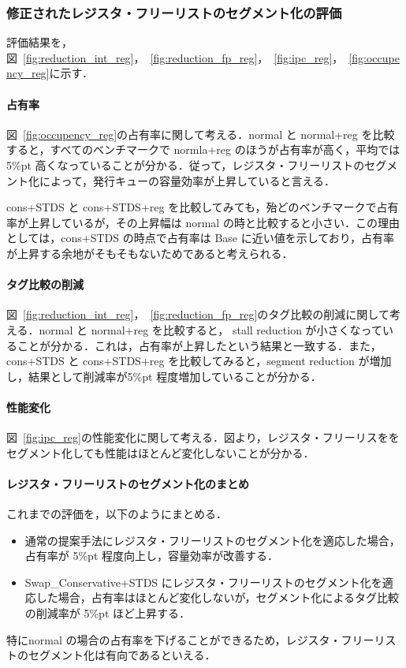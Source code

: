 \documentclass[twocolumn]{jsarticle}
\begin{document}
  \subsubsection{修正されたレジスタ・フリーリストのセグメント化の評価}
  評価結果を，図~\ref{fig:reduction_int_reg}，~\ref{fig:reduction_fp_reg}，~\ref{fig:ipc_reg}，~\ref{fig:occupency_reg}に示す．

  \paragraph{占有率}
  図~\ref{fig:occupency_reg}の占有率に関して考える．normal と normal+reg を比較すると，すべてのベンチマークで normla+reg のほうが占有率が高く，平均では 5\%pt 高くなっていることが分かる．従って，レジスタ・フリーリストのセグメント化によって，発行キューの容量効率が上昇していると言える．

  cons+STDS と cons+STDS+reg を比較してみても，殆どのベンチマークで占有率が上昇しているが，その上昇幅は normal の時と比較すると小さい．この理由としては，cons+STDS の時点で占有率は Base に近い値を示しており，占有率が上昇する余地がそもそもないためであると考えられる．

  \paragraph{タグ比較の削減}
  図~\ref{fig:reduction_int_reg}，~\ref{fig:reduction_fp_reg}のタグ比較の削減に関して考える．normal と normal+reg を比較すると， stall reduction が小さくなっていることが分かる．これは，占有率が上昇したという結果と一致する．また，cons+STDS と cons+STDS+reg を比較してみると，segment reduction が増加し，結果として削減率が5\%pt 程度増加していることが分かる．

  \paragraph{性能変化}
  図~\ref{fig:ipc_reg}の性能変化に関して考える．図より，レジスタ・フリーリスををセグメント化しても性能はほとんど変化しないことが分かる．

  \paragraph{レジスタ・フリーリストのセグメント化のまとめ}
  これまでの評価を，以下のようにまとめる．
  \begin{itemize}
    \item 通常の提案手法にレジスタ・フリーリストのセグメント化を適応した場合，占有率が 5\%pt 程度向上し，容量効率が改善する．
    \item Swap\_Conservative+STDS にレジスタ・フリーリストのセグメント化を適応した場合，占有率はほとんど変化しないが，セグメント化によるタグ比較の削減率が 5\%pt ほど上昇する．
  \end{itemize}
  特にnormal の場合の占有率を下げることができるため，レジスタ・フリーリストのセグメント化は有向であるといえる．
  
\end{document}
